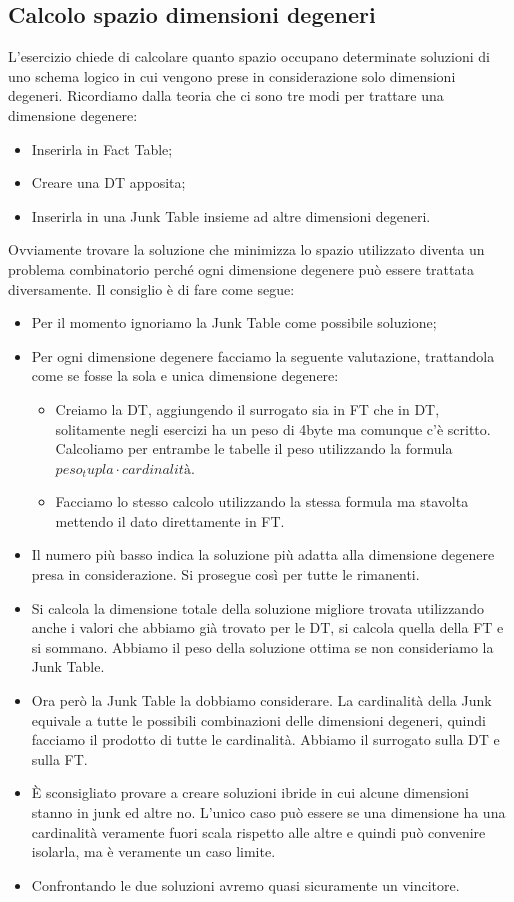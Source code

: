 \subsection{Calcolo spazio dimensioni degeneri}
L'esercizio chiede di calcolare quanto spazio occupano determinate soluzioni di uno schema logico in cui vengono prese in considerazione solo dimensioni degeneri.
\noindent Ricordiamo dalla teoria che ci sono tre modi per trattare una dimensione degenere:
\begin{itemize}
	\item Inserirla in Fact Table;
	\item Creare una DT apposita;
	\item Inserirla in una Junk Table insieme ad altre dimensioni degeneri.
\end{itemize}
Ovviamente trovare la soluzione che minimizza lo spazio utilizzato diventa un problema combinatorio perché ogni dimensione degenere può essere trattata diversamente. Il consiglio è di fare come segue:
\begin{itemize}
	\item Per il momento ignoriamo la Junk Table come possibile soluzione;
	\item Per ogni dimensione degenere facciamo la seguente valutazione, trattandola come se fosse la sola e unica dimensione degenere:
	\begin{itemize}
		\item Creiamo la DT, aggiungendo il surrogato sia in FT che in DT, solitamente negli esercizi ha un peso di 4byte ma comunque c'è scritto. Calcoliamo per entrambe le tabelle il peso utilizzando la formula $peso_tupla \cdot cardinalità$.
		\item Facciamo lo stesso calcolo utilizzando la stessa formula ma stavolta mettendo il dato direttamente in FT.
	\end{itemize}
	\item Il numero più basso indica la soluzione più adatta alla dimensione degenere presa in considerazione. Si prosegue così per tutte le rimanenti.
	\item Si calcola la dimensione totale della soluzione migliore trovata utilizzando anche i valori che abbiamo già trovato per le DT, si calcola quella della FT e si sommano. Abbiamo il peso della soluzione ottima se non consideriamo la Junk Table.
	\item Ora però la Junk Table la dobbiamo considerare. La cardinalità della Junk equivale a tutte le possibili combinazioni delle dimensioni degeneri, quindi facciamo il prodotto di tutte le cardinalità. Abbiamo il surrogato sulla DT e sulla FT.
	\item È sconsigliato provare a creare soluzioni ibride in cui alcune dimensioni stanno in junk ed altre no. L'unico caso può essere se una dimensione ha una cardinalità veramente fuori scala rispetto alle altre e quindi può convenire isolarla, ma è veramente un caso limite.
	\item Confrontando le due soluzioni avremo quasi sicuramente un vincitore.
\end{itemize}

